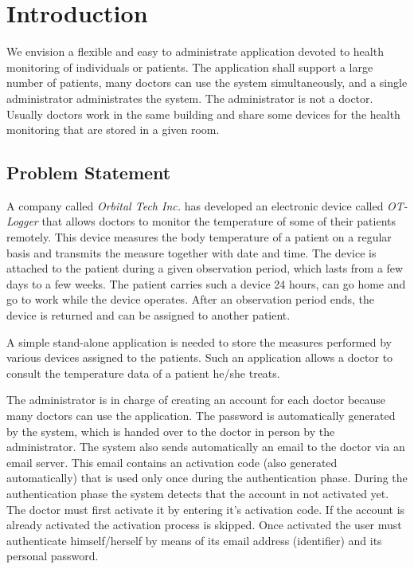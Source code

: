 \documentclass[fontsize=12pt,
               paper=a4,
               twoside=false,
               parskip=half,
               ]{scrartcl}
\begin{document}
\newcommand{\doctitle}{Vision}


\tableofcontents

\section{Introduction}

We envision a flexible and easy to administrate application devoted to health monitoring of individuals or patients. The application shall support a large number of patients, many doctors can use the system simultaneously, and a single administrator administrates the system. The administrator is not a doctor. Usually doctors work in the same building and share some devices for the health monitoring that are stored in a given room.

\subsection{Problem Statement}

A company called \emph{Orbital Tech Inc.} has developed an electronic device called \emph{OT-Logger} that allows doctors to monitor the temperature of some of their patients remotely. This device measures the body temperature of a patient on a regular basis and transmits the measure together with date and time. The device is attached to the patient during a given observation period, which lasts from a few days to a few weeks. The patient carries such a device 24 hours, can go home and go to work while the device operates. After an observation period ends, the device is returned and can be assigned to another patient.

A simple stand-alone application is needed to store the measures performed by various devices assigned to the patients. Such an application allows a doctor to consult the temperature data of a patient he/she treats.

The administrator is in charge of creating an account for each doctor because many doctors can use the application. The password is automatically generated by the system, which is handed over to the doctor in person by the administrator. The system also sends automatically an email to the doctor via an email server. This email contains an activation code (also generated automatically) that is used only once during the authentication phase. During the authentication phase the system detects that the account in not activated yet. The doctor must first activate it by entering it's activation code. If the account is already activated the activation process is skipped. Once activated the user must authenticate himself/herself by means of its email address (identifier) and its personal password.
\end{document}
